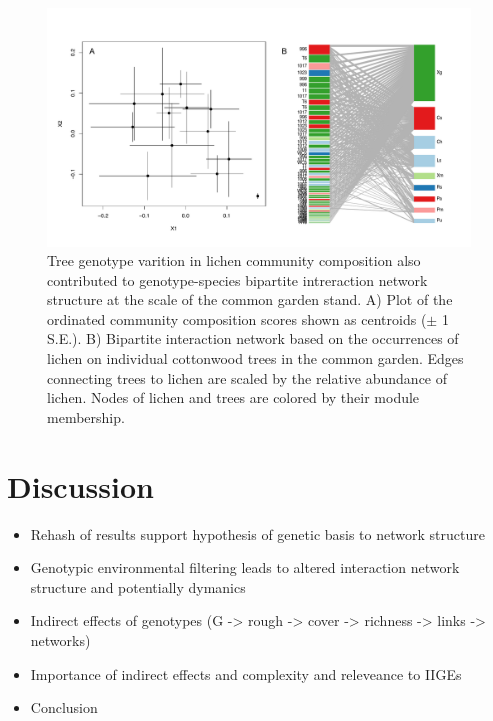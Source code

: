 \documentclass[9pt,twocolumn,twoside,lineno]{pnas-new}
\begin{document}
{\begin{figure}
\centering
\includegraphics[width = \textwidth]{lcn_com_bpnet.pdf}
\caption{Tree genotype varition in lichen community composition also
  contributed to genotype-species bipartite intreraction network
  structure at the scale of the common garden stand. A) Plot of the
  ordinated community composition scores shown as centroids ($\pm$ 1
  S.E.). B) Bipartite interaction network based on the occurrences of
  lichen on individual cottonwood trees in the common garden. Edges
  connecting trees to lichen are scaled by the relative abundance of
  lichen. Nodes of lichen and trees are colored by their module
  membership.}
\label{fig:bpnet}
\end{figure}




}


\showmatmethods{} %


\section*{Discussion}

\begin{itemize}
\item Rehash of results support hypothesis of genetic basis to network structure
\item Genotypic environmental filtering leads to altered interaction
  network structure and potentially dymanics
\item Indirect effects of genotypes (G -> rough -> cover -> richness
  -> links -> networks)
\item Importance of indirect effects and complexity and releveance to IIGEs
\item Conclusion
\end{itemize}
\end{document}
